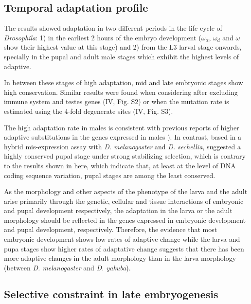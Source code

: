 
\subsection{Temporal adaptation profile}

The results showed adaptation in two different periods in the life cycle of \textit{Drosophila}: 
1) in the earliest 2 hours of the embryo development ($\omega_{\alpha}$, $\omega_{d}$ and $\omega$ show their highest value at this stage) and 
2) from the L3 larval stage onwards, specially in the pupal and adult male stages which exhibit the highest levels of adaptive.

In between these stages of high adaptation, mid and late embryonic stages show high conservation. 
Similar results were found when considering after excluding immune system and testes genes (IV, Fig. S2) or when the mutation rate is estimated using the 4-fold degenerate sites (IV, Fig. S3).

The high adaptation rate in males is consistent with previous reports of higher adaptive substitutions in the genes expressed in males \citealp{Proschel2006,Haerty2007}). 
In contrast, based in a hybrid mis-expression assay with \textit{D. melanogaster} and \textit{D. sechellia}, \citet{Artieri2010} suggested a highly conserved pupal stage under strong stabilizing selection, which is contrary to the results shown in here, which indicate that, at least at the level of DNA coding sequence variation, pupal stages are among the least conserved.

As the morphology and other aspects of the phenotype of the larva and the adult arise primarily through the genetic, cellular and tissue interactions of embryonic and pupal development respectively, the adaptation in the larva or the adult morphology should be reflected in the genes expressed in embryonic development and pupal development, respectively.
Therefore, the evidence that most embryonic development shows low rates of adaptive change while the larva and pupa stages show higher rates of adaptative change suggests that there has been more adaptive changes in the adult morphology than in the larva morphology (between \textit{D. melanogaster} and \textit{D. yakuba}).

\subsection{Selective constraint in late embryogenesis} \label{OmegaA_late_embryo}


